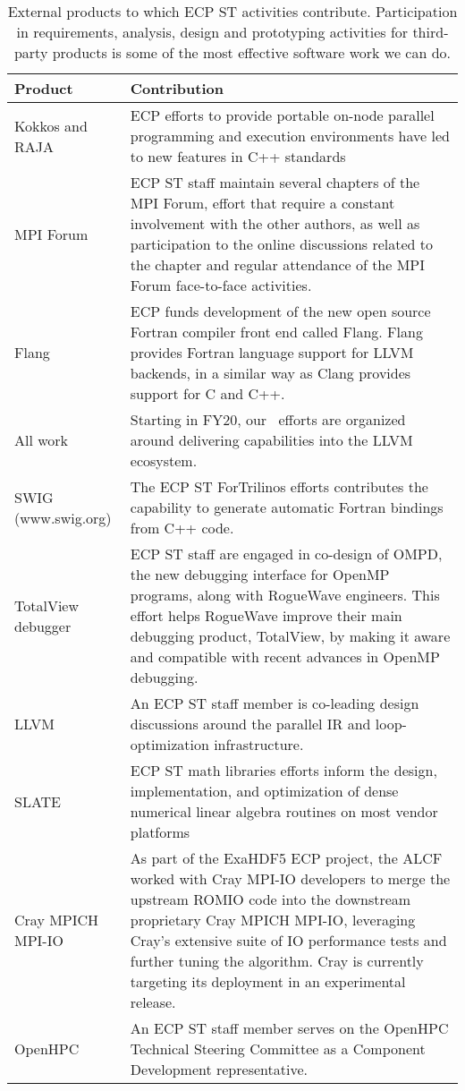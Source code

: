 \begin{table}
	\begin{tabular}{|L{1.5in}|L{4in}|}\hline
			Product & Contribution\\\hline
			Kokkos and RAJA & ECP efforts to provide portable on-node parallel programming and execution environments have led to new features in C++ standards \\\hline
			MPI Forum & ECP ST staff maintain several chapters of the MPI Forum, effort that require a constant involvement with the other authors, as well as participation to the online discussions related to the chapter and regular attendance of the MPI Forum face-to-face activities.\\\hline
			Flang & ECP funds development of the new open source Fortran compiler front end called Flang. Flang provides Fortran language support for LLVM backends, in a similar way as Clang provides support for C and C++.\\\hline 
			All \tools work & Starting in FY20, our \tools\ efforts are organized around delivering capabilities into the LLVM ecosystem.  \\\hline
			SWIG (www.swig.org) & The ECP ST ForTrilinos efforts contributes the capability to generate automatic Fortran bindings from C++ code.\\\hline
			TotalView debugger & ECP ST staff are engaged in co-design of OMPD, the new debugging interface for OpenMP programs, along with RogueWave engineers. This effort helps RogueWave improve their main debugging product, TotalView, by making it aware and compatible with recent advances in OpenMP debugging.\\\hline
			LLVM &  An ECP ST staff member is co-leading design discussions around the parallel IR and loop-optimization infrastructure.\\\hline
			SLATE & ECP ST math libraries efforts inform the design, implementation, and optimization of dense numerical linear algebra routines on most vendor platforms\\\hline
			Cray MPICH MPI-IO & As part of the ExaHDF5 ECP project, the ALCF worked with Cray MPI-IO developers to merge the upstream ROMIO code into the downstream proprietary Cray MPICH MPI-IO, leveraging Cray’s extensive suite of IO performance tests and further tuning the algorithm.  Cray is currently targeting its deployment in an experimental release.\\\hline
			OpenHPC & An ECP ST staff member serves on the OpenHPC Technical Steering Committee as a Component Development representative.\\\hline
		\end{tabular}
		\caption{\label{table:externalproducts} External products to which ECP ST activities contribute.  Participation in requirements, analysis, design and prototyping activities for third-party products is some of the most effective software work we can do.}
	\end{table}
